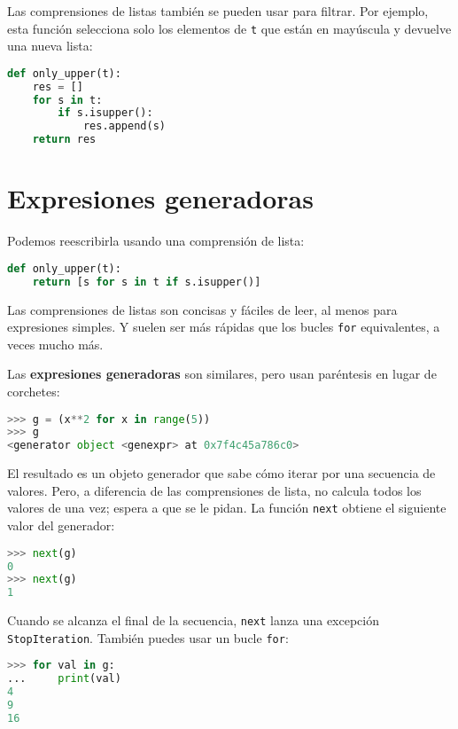Las comprensiones de listas también se pueden usar para filtrar. Por ejemplo, esta función selecciona solo los elementos de \texttt{t} que están en mayúscula y devuelve una nueva lista:

\begin{lstlisting}[language=Python]
def only_upper(t):
    res = []
    for s in t:
        if s.isupper():
            res.append(s)
    return res
\end{lstlisting}

\section{Expresiones generadoras}

Podemos reescribirla usando una comprensión de lista:

\begin{lstlisting}[language=Python]
def only_upper(t):
    return [s for s in t if s.isupper()]
\end{lstlisting}

Las comprensiones de listas son concisas y fáciles de leer, al menos para expresiones simples. Y suelen ser más rápidas que los bucles \texttt{for} equivalentes, a veces mucho más.

Las \textbf{expresiones generadoras} son similares, pero usan paréntesis en lugar de corchetes:

\begin{lstlisting}[language=Python]
>>> g = (x**2 for x in range(5))
>>> g
<generator object <genexpr> at 0x7f4c45a786c0>
\end{lstlisting}

El resultado es un objeto generador que sabe cómo iterar por una secuencia de valores. Pero, a diferencia de las comprensiones de lista, no calcula todos los valores de una vez; espera a que se le pidan. La función \texttt{next} obtiene el siguiente valor del generador:

\begin{lstlisting}[language=Python]
>>> next(g)
0
>>> next(g)
1
\end{lstlisting}

Cuando se alcanza el final de la secuencia, \texttt{next} lanza una excepción \texttt{StopIteration}. También puedes usar un bucle \texttt{for}:

\begin{lstlisting}[language=Python]
>>> for val in g:
...     print(val)
4
9
16
\end{lstlisting}

